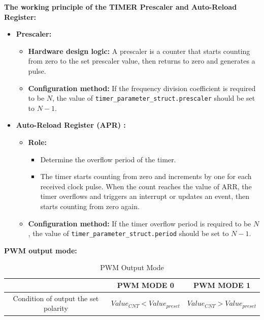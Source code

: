 \documentclass[12pt,a4paper]{ctexart}
\begin{document}
\textbf{The working principle of the TIMER Prescaler and Auto-Reload Register:}
\begin{itemize}
    \item \textbf{Prescaler:}
          \begin{itemize}
              \item \textbf{Hardware design logic:} A prescaler is a counter that starts counting from zero to the set prescaler value, then returns to zero and generates a pulse.
              \item \textbf{Configuration method:} If the frequency division coefficient is required to be $N$, the value of \verb|timer_parameter_struct.prescaler| should be set to $N-1$.
          \end{itemize}
    \item \textbf{Auto-Reload Register (APR) :}
          \begin{itemize}
              \item \textbf{Role:}
                    \begin{itemize}
                        \item Determine the overflow period of the timer.
                        \item The timer starts counting from zero and increments by one for each received clock pulse. When the count reaches the value of ARR, the timer overflows and triggers an interrupt or updates an event, then starts counting from zero again.
                    \end{itemize}
              \item \textbf{Configuration method:} If the timer overflow period is required to be $N$, the value of \verb|timer_parameter_struct.period| should be set to $N-1$.
          \end{itemize}
\end{itemize}

\textbf{PWM output mode:}
\begin{table}[htbp]
    \centering
    \caption{PWM Output Mode}
    \begin{tabular}{|c|c|c|}
        \hline
                                             & PWM MODE 0                   & PWM MODE 1                   \\
        \hline
        Condition of output the set polarity & $Value_{CNT}<Value_{preset}$ & $Value_{CNT}>Value_{preset}$ \\
        \hline
    \end{tabular}
\end{table}
\end{document}
